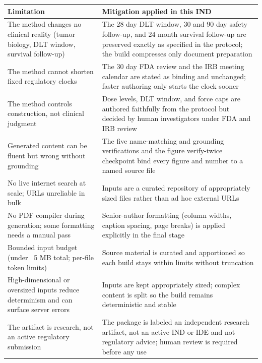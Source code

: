 \noindent\begin{tabularx}{\textwidth}{L{4.8cm} Y}
\toprule
\textbf{Limitation} & \textbf{Mitigation applied in this IND} \\
\midrule
The method changes no clinical reality (tumor biology, DLT window, survival follow-up) & The 28 day DLT window, 30 and 90 day safety follow-up, and 24 month survival follow-up are preserved exactly as specified in the protocol; the build compresses only document preparation \\
The method cannot shorten fixed regulatory clocks & The 30 day FDA review and the IRB meeting calendar are stated as binding and unchanged; faster authoring only starts the clock sooner \\
The method controls construction, not clinical judgment & Dose levels, DLT window, and force caps are authored faithfully from the protocol but decided by human investigators under FDA and IRB review \\
Generated content can be fluent but wrong without grounding & The five name-matching and grounding verifications and the figure verify-twice checkpoint bind every figure and number to a named source file \\
No live internet search at scale; URLs unreliable in bulk & Inputs are a curated repository of appropriately sized files rather than ad hoc external URLs \\
No PDF compiler during generation; some formatting needs a manual pass & Senior-author formatting (column widths, caption spacing, page breaks) is applied explicitly in the final stage \\
Bounded input budget (under ~5 MB total; per-file token limits) & Source material is curated and apportioned so each build stays within limits without truncation \\
High-dimensional or oversized inputs reduce determinism and can surface server errors & Inputs are kept appropriately sized; complex content is split so the build remains deterministic and stable \\
The artifact is research, not an active regulatory submission & The package is labeled an independent research artifact, not an active IND or IDE and not regulatory advice; human review is required before any use \\
\bottomrule
\end{tabularx}

